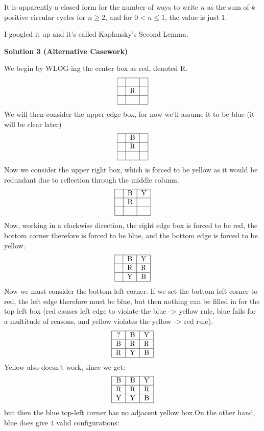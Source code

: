 \begin{enumerate}
 It is apparently a closed form for the number of ways to write $n$ as the sum of $k$ positive circular cycles for $n \ge 2$, and for $0<n \le 1$, the value is just 1.

 
I googled it up and it's called Kaplansky's Second Lemma.

 



\textbf{Solution 3 (Alternative Casework)}

We begin by WLOG-ing the center box as red, denoted R.
 \[\begin{tabular}{|c|c|c|} \hline  &  &  \\ \hline  & R &  \\ \hline  &  &  \\ \hline \end{tabular}\]We will then consider the upper edge box, for now we'll assume it to be blue (it will be clear later)
 \[\begin{tabular}{|c|c|c|} \hline  & B &  \\ \hline  & R &  \\ \hline  &  &  \\ \hline \end{tabular}\]Now we consider the upper right box, which is forced to be yellow as it would be redundant due to reflection through the middle column.
 \[\begin{tabular}{|c|c|c|} \hline  & B & Y \\ \hline  & R &  \\ \hline  &  &  \\ \hline \end{tabular}\]Now, working in a clockwise direction, the right edge box is forced to be red, the bottom corner therefore is forced to be blue, and the bottom edge is forced to be yellow.
 \[\begin{tabular}{|c|c|c|} \hline  & B & Y \\ \hline  & R & R \\ \hline  & Y & B \\ \hline \end{tabular}\]Now we must consider the bottom left corner. If we set the bottom left corner to red, the left edge therefore must be blue, but then nothing can be filled in for the top left box (red causes left edge to violate the blue -> yellow rule, blue fails for a multitude of reasons, and yellow violates the yellow -> red rule).
 \[\begin{tabular}{|c|c|c|} \hline ? & B & Y \\ \hline B & R & R \\ \hline R & Y & B \\ \hline \end{tabular}\]Yellow also doesn't work, since we get:
 \[\begin{tabular}{|c|c|c|} \hline B & B & Y \\ \hline R & R & R \\ \hline Y & Y & B \\ \hline \end{tabular}\]but then the blue top-left corner has no adjacent yellow box.On the other hand, blue does give $4$ valid configurations:


\end{enumerate}

